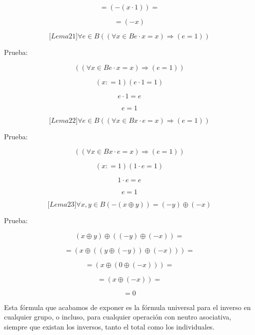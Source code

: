 \begin{enumerate}
\begin{enumerate}
\begin{enumerate}
      \[{= \left( {- \left( {x \cdot 1} \right)} \right)} =\]

      \[= \left( {- x} \right)\]

      \[{\lbrack{{Lema}21}\rbrack}\forall{e \in B}\left( {\left( {\forall{x \in B}{{e \cdot x} = x}} \right)\Rightarrow\left( {e = 1} \right)} \right)\]

      Prueba:

      \[\left( {\left( {\forall{x \in B}{{e \cdot x} = x}} \right)\Rightarrow\left( {e = 1} \right)} \right)\]

      \[\left( {x{: = 1}} \right)\left( {{e \cdot 1} = 1} \right)\]

      \[{e \cdot 1} = e\]

      \[e = 1\]

      \[{\lbrack{{Lema}22}\rbrack}\forall{e \in B}\left( {\left( {\forall{x \in B}{{x \cdot e} = x}} \right)\Rightarrow\left( {e = 1} \right)} \right)\]

      Prueba:

      \[\left( {\left( {\forall{x \in B}{{x \cdot e} = x}} \right)\Rightarrow\left( {e = 1} \right)} \right)\]

      \[\left( {x{: = 1}} \right)\left( {{1 \cdot e} = 1} \right)\]

      \[{1 \cdot e} = e\]

      \[e = 1\]

      \[{\lbrack{{Lema}23}\rbrack}\forall x,{y \in B}{\left( {- \left( {x \oplus y} \right)} \right) = \left( {- y} \right)} \oplus \left( {- x} \right)\]

      Prueba:

      \[\left( {x \oplus y} \right) \oplus {\left( {\left( {- y} \right) \oplus \left( {- x} \right)} \right) =}\]

      \[{= \left( {x \oplus \left( {\left( {y \oplus \left( {- y} \right)} \right) \oplus \left( {- x} \right)} \right)} \right)} =\]

      \[{= \left( {x \oplus \left( {0 \oplus \left( {- x} \right)} \right)} \right)} =\]

      \[{= \left( {x \oplus \left( {- x} \right)} \right)} =\]

      \[= 0\]

      Esta fórmula que acabamos de exponer es la fórmula universal para
      el inverso en cualquier grupo, o in\-cluso, para cualquier
      operación con neutro asociativa, siempre que existan los inversos,
      tanto el total como los individuales.


\end{enumerate}
\end{enumerate}
\end{enumerate}
